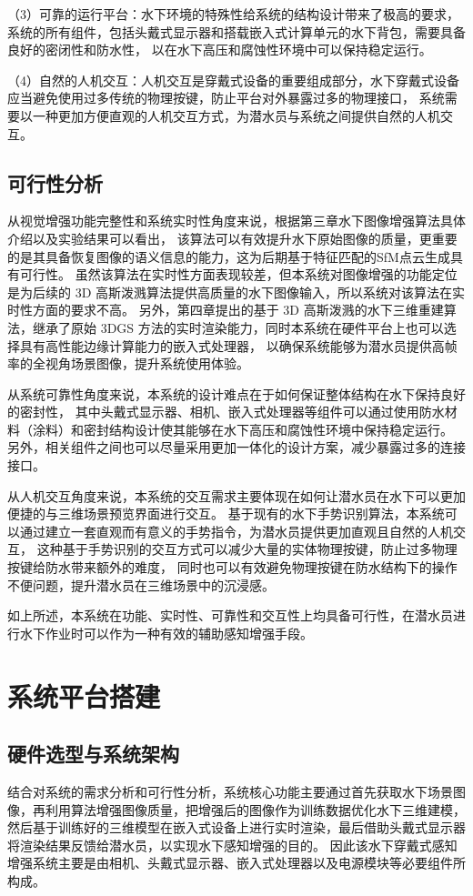 （3）可靠的运行平台：水下环境的特殊性给系统的结构设计带来了极高的要求，
系统的所有组件，包括头戴式显示器和搭载嵌入式计算单元的水下背包，需要具备良好的密闭性和防水性，
以在水下高压和腐蚀性环境中可以保持稳定运行。

（4）自然的人机交互：人机交互是穿戴式设备的重要组成部分，水下穿戴式设备应当避免使用过多传统的物理按键，防止平台对外暴露过多的物理接口，
系统需要以一种更加方便直观的人机交互方式，为潜水员与系统之间提供自然的人机交互。

\subsection{可行性分析}
从视觉增强功能完整性和系统实时性角度来说，根据第三章水下图像增强算法具体介绍以及实验结果可以看出，
该算法可以有效提升水下原始图像的质量，更重要的是其具备恢复图像的语义信息的能力，这为后期基于特征匹配的SfM点云生成具有可行性。
虽然该算法在实时性方面表现较差，但本系统对图像增强的功能定位是为后续的 3D 高斯泼溅算法提供高质量的水下图像输入，所以系统对该算法在实时性方面的要求不高。
另外，第四章提出的基于 3D 高斯泼溅的水下三维重建算法，继承了原始 3DGS 方法的实时渲染能力，同时本系统在硬件平台上也可以选择具有高性能边缘计算能力的嵌入式处理器，
以确保系统能够为潜水员提供高帧率的全视角场景图像，提升系统使用体验。

从系统可靠性角度来说，本系统的设计难点在于如何保证整体结构在水下保持良好的密封性，
其中头戴式显示器、相机、嵌入式处理器等组件可以通过使用防水材料（涂料）和密封结构设计使其能够在水下高压和腐蚀性环境中保持稳定运行。
另外，相关组件之间也可以尽量采用更加一体化的设计方案，减少暴露过多的连接接口。

从人机交互角度来说，本系统的交互需求主要体现在如何让潜水员在水下可以更加便捷的与三维场景预览界面进行交互。
基于现有的水下手势识别算法，本系统可以通过建立一套直观而有意义的手势指令，为潜水员提供更加直观且自然的人机交互，
这种基于手势识别的交互方式可以减少大量的实体物理按键，防止过多物理按键给防水带来额外的难度，
同时也可以有效避免物理按键在防水结构下的操作不便问题，提升潜水员在三维场景中的沉浸感。

如上所述，本系统在功能、实时性、可靠性和交互性上均具备可行性，在潜水员进行水下作业时可以作为一种有效的辅助感知增强手段。

\section{系统平台搭建} 
\subsection{硬件选型与系统架构}
结合对系统的需求分析和可行性分析，系统核心功能主要通过首先获取水下场景图像，再利用算法增强图像质量，把增强后的图像作为训练数据优化水下三维建模，
然后基于训练好的三维模型在嵌入式设备上进行实时渲染，最后借助头戴式显示器将渲染结果反馈给潜水员，以实现水下感知增强的目的。
因此该水下穿戴式感知增强系统主要是由相机、头戴式显示器、嵌入式处理器以及电源模块等必要组件所构成。

